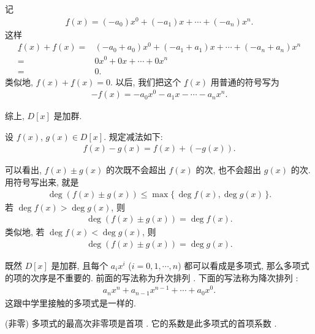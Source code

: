 \begin{pf}
    记
    \begin{align*}
        \underline{f}(x) = (-a_0) x^0 + (-a_1) x + \cdots + (-a_n) x^n.
    \end{align*}
    这样
    \begin{align*}
        \underline{f}(x) + f(x)
        = {} & (-a_0 + a_0) x^0 + (-a_1 + a_1) x + \cdots + (-a_n + a_n) x^n \\
        = {} & 0 x^0 + 0 x + \cdots + 0 x^n                                  \\
        = {} & 0.
    \end{align*}
    类似地, $f(x) + \underline{f}(x) = 0$. 以后, 我们把这个 $\underline{f}(x)$ 用普通的符号写为
    \begin{align*}
        -f(x) = -a_0 x^0 - a_1 x - \cdots - a_n x^n.
    \end{align*}

    综上, $D[x]$ 是加群.
\end{pf}

\begin{definition}
    设 $f(x)$, $g(x) \in D[x]$. 规定减法如下:
    \begin{align*}
        f(x) - g(x) = f(x) + (-g(x)).
    \end{align*}
\end{definition}

\begin{remark}
    可以看出, $f(x) \pm g(x)$ 的次既不会超出 $f(x)$ 的次, 也不会超出 $g(x)$ 的次. 用符号写出来, 就是
    \begin{align*}
        \deg (f(x) \pm g(x)) \leq \max \{\, \deg f(x), \deg g(x) \,\}.
    \end{align*}
    若 $\deg f(x) > \deg g(x)$, 则
    \begin{align*}
        \deg (f(x) \pm g(x)) = \deg f(x).
    \end{align*}
    类似地, 若 $\deg f(x) < \deg g(x)$, 则
    \begin{align*}
        \deg (f(x) \pm g(x)) = \deg g(x).
    \end{align*}
\end{remark}

\begin{remark}
    既然 $D[x]$ 是加群, 且每个 $a_i x^i$ ($i = 0,1,\cdots,n$) 都可以看成是多项式, 那么多项式的项的次序是不重要的. 前面的写法称为升次排列 . 下面的写法称为降次排列 :
    \begin{align*}
        a_n x^n + a_{n-1} x^{n-1} + \cdots + a_0 x^0.
    \end{align*}
    这跟中学里接触的多项式是一样的.

    (非零) 多项式的最高次非零项是首项 . 它的系数是此多项式的首项系数 .
\end{remark}

